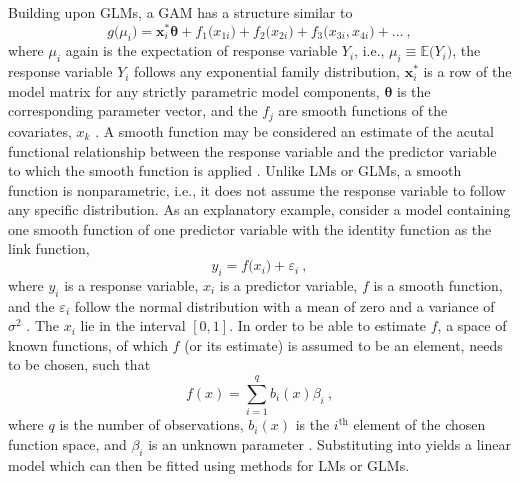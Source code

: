 Building upon GLMs, a GAM has a structure similar to
\begin{equation}
  \label{eq:GeneralizedAdditiveModel}
  g\bigl(\mu_i\bigr) = \symbf{x}_i^* \symbf{\theta} + f_{1}\bigl(x_{1i}\bigr) + f_{2}\bigl(x_{2i}\bigr) + f_{3}\bigl(x_{3i}, x_{4i}\bigr) + \ldots~,
\end{equation}
where \(\mu_i\) again is the expectation of response variable \(Y_i\), i.e., \(\mu_i \equiv \mathbb{E}\bigl(Y_i\bigr)\), the response variable \(Y_i\) follows any exponential family distribution, \(\symbf{x}_i^*\) is a row of the model matrix for any strictly parametric model components, \(\symbf{\theta}\) is the corresponding parameter vector, and the \(f_j\) are smooth functions of the covariates, \(x_k\) \parencite{Wood2006}.  A smooth function may be considered an estimate of the acutal functional relationship between the response variable and the predictor variable to which the smooth function is applied \parencite{Hastie1991}.  Unlike LMs or GLMs, a smooth function is nonparametric, i.e., it does not assume the response variable to follow any specific distribution.
As an explanatory example, consider a model containing one smooth function of one predictor variable with the identity function as the link function,
\begin{equation}
  \label{eq:GeneralizedAdditiveModelSimple}
  y_i = f\bigl(x_i\bigr) + \varepsilon_i~,
\end{equation}
where \(y_i\) is a response variable, \(x_i\) is a predictor variable, \(f\) is a smooth function, and the \(\varepsilon_i\) follow the normal distribution with a mean of zero and a variance of \(\sigma^2\) \parencite{Wood2006}.  The \(x_i\) lie in the interval \([0, 1]\).  In order to be able to estimate \(f\), a space of known functions, of which \(f\) (or its estimate) is assumed to be an element, needs to be chosen, such that
\begin{equation}
  \label{eq:SmoothFunctionBasis}
  f(x) = \sum_{i=1}^q b_i(x)\beta_i~,
\end{equation}
where \(q\) is the number of observations, \(b_i(x)\) is the \(i^{\text{th}}\) element of the chosen function space, and \(\beta_i\) is an unknown parameter \parencite{Wood2006}.  Substituting  into  yields a linear model which can then be fitted using methods for LMs or GLMs.

